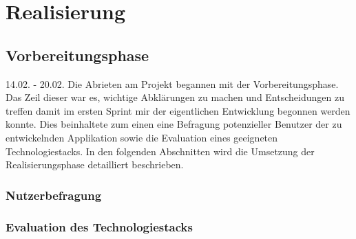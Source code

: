 \chapter{Realisierung}

\section{Vorbereitungsphase}
14.02. - 20.02.
Die Abrieten am Projekt begannen mit der Vorbereitungsphase. Das Zeil dieser war es, wichtige Abklärungen zu machen und Entscheidungen zu treffen damit im ersten Sprint mir der eigentlichen Entwicklung begonnen werden konnte.
Dies beinhaltete zum einen eine Befragung potenzieller Benutzer der zu entwickelnden Applikation sowie die Evaluation eines geeigneten Technologiestacks. In den folgenden Abschnitten wird die Umsetzung der Realisierungsphase detailliert beschrieben.

\subsection{Nutzerbefragung}



\subsection{Evaluation des Technologiestacks}

\newpage


\newpage

\newpage

\newpage

\newpage

\newpage

\newpage
